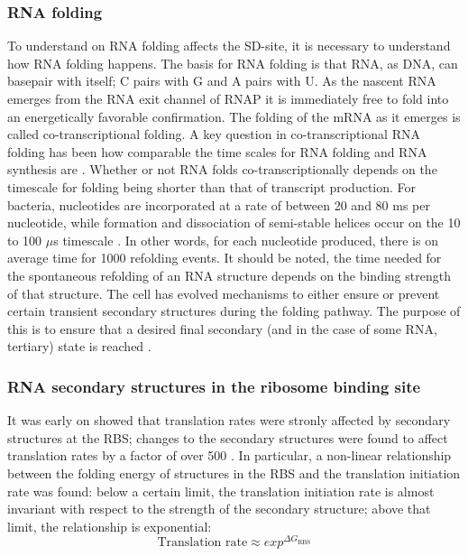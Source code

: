 \subsubsection{RNA folding}
To understand on RNA folding affects the SD-site, it is necessary to understand
how RNA folding happens. The basis for RNA folding is that RNA, as DNA, can
basepair with itself; C pairs with G and A pairs with U. As the nascent RNA
emerges from the RNA exit channel of RNAP it is immediately free to fold into
an energetically favorable confirmation. The folding of the mRNA as it emerges
is called co-transcriptional folding. A key question in co-transcriptional RNA
folding has been how comparable the time scales for RNA folding and RNA
synthesis are \cite{de_smit_translational_2003-1}. Whether or not RNA folds
co-transcriptionally depends on the timescale for folding being shorter than
that of transcript production. For bacteria, nucleotides are incorporated at a
rate of between 20 and 80 ms per nucleotide, while formation and dissociation
of semi-stable helices occur on the 10 to 100 $\mu$s timescale
\cite{isambert_jerky_2009}. In other words, for each nucleotide produced, there
is on average time for 1000 refolding events. It should be noted, the time
needed for the spontaneous refolding of an RNA structure depends on the binding
strength of that structure. The cell has evolved mechanisms to either ensure or
prevent certain transient secondary structures during the folding pathway. The
purpose of this is to ensure that a desired final secondary (and in the case of
some RNA, tertiary) state is reached \cite{pan_rna_2006-1}.

\subsubsection{RNA secondary structures in the ribosome binding site}
It was early on showed that translation rates were stronly affected by
secondary structures at the RBS; changes to the secondary structures were found
to affect translation rates by a factor of over 500
\cite{de_smit_secondary_1990}. In particular, a non-linear relationship between
the folding energy of structures in the RBS and the translation initiation
rate was found: below a certain limit, the translation initiation rate is almost
invariant with respect to the strength of the secondary structure; above that
limit, the relationship is exponential:
\begin{equation*}
	\text{Translation rate} \approx exp^{\Delta G_{\text{RBS}}}
\end{equation*}

